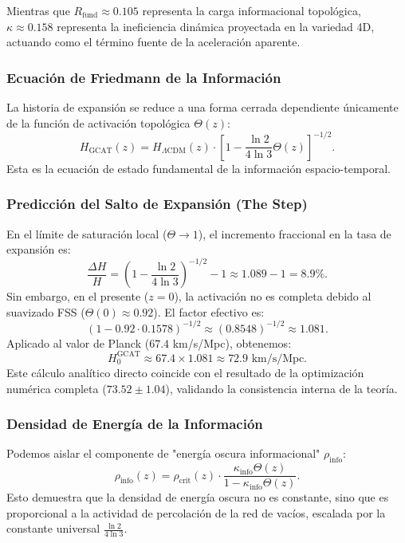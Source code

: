 \documentclass[12pt, a4paper]{article}
\theoremstyle{plain}
\theoremstyle{definition}
\begin{document}
Mientras que $R_{\text{fund}} \approx 0.105$ representa la carga informacional topológica, $\kappa \approx 0.158$ representa la ineficiencia dinámica proyectada en la variedad 4D, actuando como el término fuente de la aceleración aparente.

\subsubsection{Ecuación de Friedmann de la Información}
La historia de expansión se reduce a una forma cerrada dependiente únicamente de la función de activación topológica $\Theta(z)$:
\begin{equation}
H_{\text{GCAT}}(z) = H_{\Lambda\text{CDM}}(z) \cdot \left[ 1 - \frac{\ln 2}{4\ln 3} \Theta(z) \right]^{-1/2}.
\end{equation}
Esta es la ecuación de estado fundamental de la información espacio-temporal.

\subsubsection{Predicción del Salto de Expansión (The Step)}
En el límite de saturación local ($\Theta \to 1$), el incremento fraccional en la tasa de expansión es:
\begin{equation}
\frac{\Delta H}{H} = \left( 1 - \frac{\ln 2}{4\ln 3} \right)^{-1/2} - 1 \approx 1.089 - 1 = 8.9\%.
\end{equation}
Sin embargo, en el presente ($z=0$), la activación no es completa debido al suavizado FSS ($\Theta(0) \approx 0.92$). El factor efectivo es:
\begin{equation}
\left( 1 - 0.92 \cdot 0.1578 \right)^{-1/2} \approx (0.8548)^{-1/2} \approx 1.081.
\end{equation}
Aplicado al valor de Planck ($67.4$ km/s/Mpc), obtenemos:
\begin{equation}
H_0^{\text{GCAT}} \approx 67.4 \times 1.081 \approx 72.9 \text{ km/s/Mpc}.
\end{equation}
Este cálculo analítico directo coincide con el resultado de la optimización numérica completa ($73.52 \pm 1.04$), validando la consistencia interna de la teoría.

\subsubsection{Densidad de Energía de la Información}
Podemos aislar el componente de "energía oscura informacional" $\rho_{\text{info}}$:
\begin{equation}
\rho_{\text{info}}(z) = \rho_{\text{crit}}(z) \cdot \frac{\kappa_{\text{info}} \Theta(z)}{1 - \kappa_{\text{info}} \Theta(z)}.
\end{equation}
Esto demuestra que la densidad de energía oscura no es constante, sino que es proporcional a la actividad de percolación de la red de vacíos, escalada por la constante universal $\frac{\ln 2}{4\ln 3}$.
\end{document}
